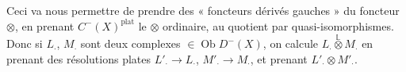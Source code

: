 \documentclass[11pt,a4paper]{article}
\begin{document}
Ceci va nous permettre de prendre des « foncteurs dérivés gauches » du foncteur $\otimes$, en prenant  $C^{-}(X)^{\text{plat}}$ le $\otimes$ ordinaire,   au quotient par quasi-isomorphismes. Donc si $L_{\cdot}$, $M_{\cdot}$ sont deux complexes  $\in\operatorname{Ob}D^{-}(X)$, on  calcule $L_{\cdot}\overset{\mathbb{L}}{\otimes}M_{\cdot}$ en prenant des résolutions plates $L'_{\cdot}\to L_{\cdot}$, $M'_{\cdot}\to M_{\cdot}$, et prenant $L'_{\cdot}\otimes M'_{\cdot}$.
\end{document}
